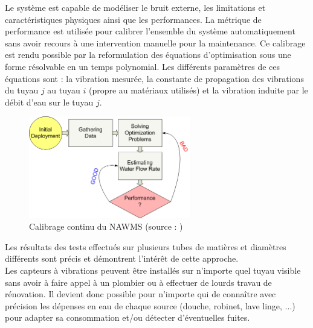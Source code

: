\documentclass[10pt, article]{llncs}
\begin{document}
		Le système est capable de modéliser le bruit externe, les limitations et caractéristiques physiques ainsi que les performances. La métrique de performance est utilisée pour calibrer l'ensemble du système automatiquement sans avoir recours à une intervention manuelle pour la maintenance. Ce calibrage est rendu possible par la reformulation des équations d'optimisation sous une forme résolvable en un temps polynomial. Les différents paramètres de ces équations sont : la vibration mesurée, la constante de propagation des vibrations du tuyau $j$ au tuyau $i$ (propre au matériaux utilisés) et la vibration induite par le débit d'eau sur le tuyau $j$.
		\begin{figure}
			\begin{center}
				\includegraphics[width=200pt]{img/nawms3.png}
			\end{center}
			\caption{Calibrage continu du NAWMS (source : \cite{kim_nawms:_2008})}
		\end{figure}
		Les résultats des tests effectués sur plusieurs tubes de matières et diamètres différents sont précis et démontrent l'intérêt de cette approche.\\
		Les capteurs à vibrations peuvent être installés sur n'importe quel tuyau visible sans avoir à faire appel à un plombier ou à effectuer de lourds travau de rénovation. Il devient donc possible pour n'importe qui de connaître avec précision les dépenses en eau de chaque source (douche, robinet, lave linge, ...) pour adapter sa consommation et/ou détecter d'éventuelles fuites. 
	
\end{document}
